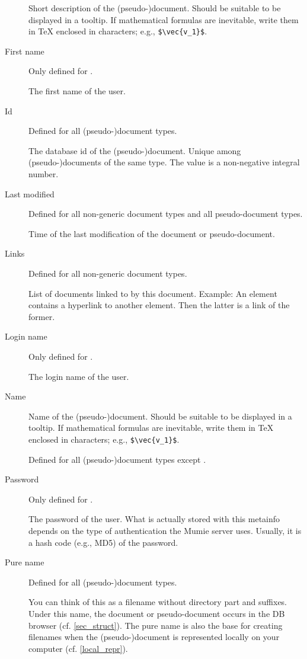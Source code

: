\documentclass{generic}
\begin{document}
\begin{description}
  Short description of the (pseudo-)document. Should be
  suitable to be displayed in a tooltip. If mathematical formulas are
  inevitable, write them in TeX enclosed in \code{\$} characters; e.g.,
  \verb'$\vec{v_1}$'.

\item[First name]
  Only defined for .

  The first name of the user.

\item[Id]
  Defined for all (pseudo-)document types.

  The database id of the (pseudo-)document. Unique among (pseudo-)documents of
  the same type. The value is a non-negative integral number.

\item[Last modified]
  Defined for all non-generic document types and all pseudo-document types.

  Time of the last modification of the document or pseudo-document.

\item[Links]
  Defined for all non-generic document types.

  List of documents linked to by this document. Example: An element
  contains a hyperlink to another element. Then the latter is a link of the
  former.

\item[Login name]
  Only defined for .

  The login name of the user.

\item[Name] Name of the (pseudo-)document. Should be suitable to be displayed
  in a tooltip. If mathematical formulas are inevitable, write them in TeX
  enclosed in \code{\$} characters; e.g., \verb'$\vec{v_1}$'.

  Defined for all (pseudo-)document types except .

\item[Password]
  Only defined for .

  The password of the user. What is actually stored with this metainfo depends
  on the type of authentication the Mumie server uses. Usually, it is a hash
  code (e.g., MD5) of the password.

\item[Pure name]
  Defined for all (pseudo-)document types.

  You can think of this as a filename without directory part and suffixes.
  Under this name, the document or pseudo-document occurs in the DB
  browser (cf.  \ref{sec_struct}). The pure name is also the base for creating
  filenames when the (pseudo-)document is represented locally on your computer
  (cf. \ref{local_repr}).


\end{description}
\end{document}
